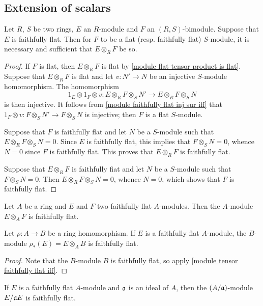 \subsection{Extension of scalars}
\begin{proposition}\label{module tensor faithfully flat iff}
Let $R$, $S$ be two rings, $E$ an $R$-module and $F$ an $(R,S)$-bimodule. Suppose that $E$ is faithfully flat. Then for $F$ to be a flat (resp. faithfully flat) $S$-module, it is necessary and sufficient that $E\otimes_RF$ be so.
\end{proposition}
\begin{proof}
If $F$ is flat, then $E\otimes_RF$ is flat by \cref{module flat tensor product is flat}. Suppose that $E\otimes_RF$ is flat and let $v:N'\to N$ be an injective $S$-module homomorphism. The homomorphism
\[1_E\otimes 1_F\otimes v:E\otimes_RF\otimes_SN'\to E\otimes_RF\otimes_SN\]
is then injective. It follows from \cref{module faithfully flat inj sur iff} that $1_F\otimes v:F\otimes_SN'\to F\otimes_SN$ is injective; then $F$ is a flat $S$-module.\par
Suppose that $F$ is faithfully flat and let $N$ be a $S$-module such that $E\otimes_RF\otimes_SN=0$. Since $E$ is faithfully flat, this implies that $F\otimes_SN=0$, whence $N=0$ since $F$ is faithfully flat. This proves that $E\otimes_RF$ is faithfully flat.\par
Suppose that $E\otimes_RF$ is faithfully fiat and let $N$ be a $S$-module such that $F\otimes_SN=0$. Then $E\otimes_RF\otimes_SN=0$, whence $N=0$, which shows that $F$ is faithfully flat.
\end{proof}
\begin{corollary}
Let $A$ be a ring and $E$ and $F$ two faithfully flat $A$-modules. Then the $A$-module $E\otimes_AF$ is faithfully flat.
\end{corollary}
\begin{proposition}\label{module faithfully flat extension}
Let $\rho:A\to B$ be a ring homomorphism. If $E$ is a faithfully flat $A$-module, the $B$-module $\rho_*(E)=E\otimes_AB$ is faithfully flat.
\end{proposition}
\begin{proof}
Note that the $B$-module $B$ is faithfully flat, so apply \cref{module tensor faithfully flat iff}.
\end{proof}
\begin{corollary}\label{module faithfully flat extension to quotient ring}
If $E$ is a faithfully flat $A$-module and $\mathfrak{a}$ is an ideal of $A$, then the $(A/\mathfrak{a})$-module $E/\mathfrak{a} E$ is faithfully flat.
\end{corollary}
